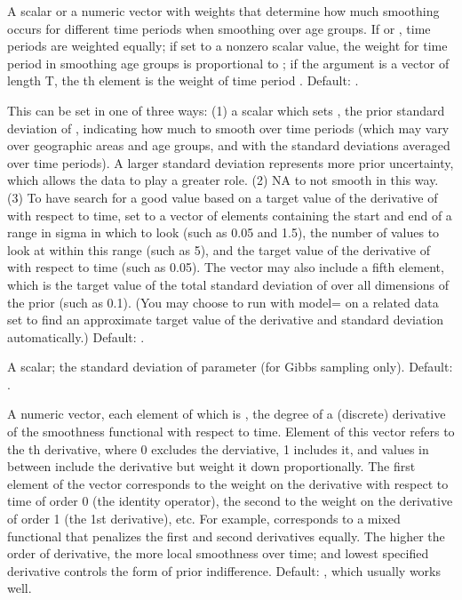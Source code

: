 \begin{Arguments}
\begin{ldescription}
\item[\code{Ha.time.weight}] A scalar or a numeric vector with weights that
determine how much smoothing occurs for different time periods when
smoothing over age groups. If  or , time periods are weighted
equally; if set to a nonzero scalar value, the weight for time
period  in smoothing age groups is proportional to
; if the argument is a vector of length T, the 
th element is the weight of time period . Default: .

\item[\code{Ht.sigma}] This can be set in one of three ways: (1) a scalar
which sets , the prior standard deviation of ,
indicating how much to smooth  over time periods (which may
vary over geographic areas and age groups, and with the standard
deviations averaged over time periods). A larger standard deviation
represents more prior uncertainty, which allows the data to play a
greater role. (2) NA to not smooth in this way. (3) To have 
search for a good value based on a target value of the derivative of
 with respect to time, set to a vector of elements containing
the start and end of a range in sigma in which to look (such as 0.05
and 1.5), the number of values to look at within this range (such as
5), and the target value of the derivative of  with respect
to time (such as 0.05). The vector may also include a fifth element,
which is the target value of the total standard deviation of 
over all dimensions of the prior (such as 0.1). (You may choose to
run  with model= on a related data set to find an
approximate target value of the derivative and standard deviation
automatically.) Default: .

\item[\code{Ht.sigma.sd}] A scalar; the standard deviation of parameter
 (for Gibbs sampling only). Default: .

\item[\code{Ht.deriv}] A numeric vector, each element of which is
, the degree of a (discrete) derivative of the
smoothness functional with respect to time. Element  of this
vector refers to the th derivative, where 0 excludes the
derviative, 1 includes it, and values in between include the
derivative but weight it down proportionally. The first element of
the vector corresponds to the weight on the derivative with respect
to time of order 0 (the identity operator), the second to the weight
on the derivative of order 1 (the 1st derivative), etc. For example,
 corresponds to a mixed functional that penalizes the
first and second derivatives equally. The higher the order of
derivative, the more local smoothness over time; and lowest
specified derivative controls the form of prior
indifference. Default: , which usually works well.


\end{ldescription}
\end{Arguments}
